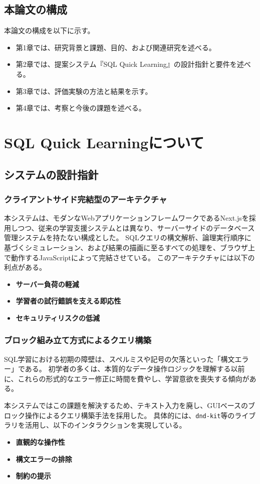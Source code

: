 \documentclass[uplatex,a4paper,12pt]{ujreport}
\begin{document}
\section{本論文の構成}
本論文の構成を以下に示す。
\begin{itemize}
  \item 第1章では、研究背景と課題、目的、および関連研究を述べる。
  \item 第2章では、提案システム『SQL Quick Learning』の設計指針と要件を述べる。
  \item 第3章では、評価実験の方法と結果を示す。
  \item 第4章では、考察と今後の課題を述べる。
\end{itemize}



\chapter{SQL Quick Learningについて}
\section{システムの設計指針}
\subsection{クライアントサイド完結型のアーキテクチャ}
本システムは、モダンなWebアプリケーションフレームワークであるNext.jsを採用しつつ、従来の学習支援システムとは異なり、サーバーサイドのデータベース管理システムを持たない構成とした。
SQLクエリの構文解析、論理実行順序に基づくシミュレーション、および結果の描画に至るすべての処理を、ブラウザ上で動作するJavaScriptによって完結させている。
このアーキテクチャには以下の利点がある。
\begin{itemize}
  \item \textbf{サーバー負荷の軽減}
  \item \textbf{学習者の試行錯誤を支える即応性}
  \item \textbf{セキュリティリスクの低減}
\end{itemize}
\subsection{ブロック組み立て方式によるクエリ構築}
SQL学習における初期の障壁は、スペルミスや記号の欠落といった「構文エラー」である。
初学者の多くは、本質的なデータ操作ロジックを理解する以前に、これらの形式的なエラー修正に時間を費やし、学習意欲を喪失する傾向がある。
\par
本システムではこの課題を解決するため、テキスト入力を廃し、GUIベースのブロック操作によるクエリ構築手法を採用した。
具体的には、\texttt{dnd-kit}等のライブラリを活用し、以下のインタラクションを実現している。
\begin{itemize}
  \item \textbf{直観的な操作性}
  \item \textbf{構文エラーの排除}
  \item \textbf{制約の提示}
\end{itemize}
\end{document}

